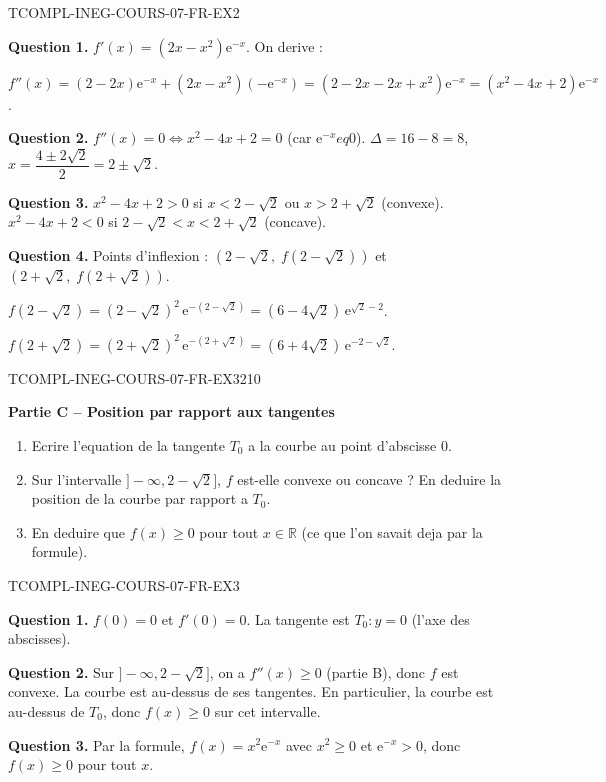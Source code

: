 \begin{corrige}{TCOMPL-INEG-COURS-07-FR-EX2}

\textbf{Question 1.} $f'(x) = (2x - x^2)\mathrm{e}^{-x}$. On derive :

$f''(x) = (2 - 2x)\mathrm{e}^{-x} + (2x - x^2)(-\mathrm{e}^{-x}) = (2 - 2x - 2x + x^2)\mathrm{e}^{-x} = (x^2 - 4x + 2)\mathrm{e}^{-x}$.

\textbf{Question 2.} $f''(x) = 0 \iff x^2 - 4x + 2 = 0$ (car $\mathrm{e}^{-x} 
eq 0$). $\Delta = 16 - 8 = 8$, $x = \dfrac{4 \pm 2\sqrt{2}}{2} = 2 \pm \sqrt{2}$.

\textbf{Question 3.} $x^2 - 4x + 2 > 0$ si $x < 2 - \sqrt{2}$ ou $x > 2 + \sqrt{2}$ (convexe). $x^2 - 4x + 2 < 0$ si $2 - \sqrt{2} < x < 2 + \sqrt{2}$ (concave).

\textbf{Question 4.} Points d'inflexion : $(2 - \sqrt{2},\; f(2-\sqrt{2}))$ et $(2 + \sqrt{2},\; f(2+\sqrt{2}))$.

$f(2-\sqrt{2}) = (2-\sqrt{2})^2\,\mathrm{e}^{-(2-\sqrt{2})} = (6-4\sqrt{2})\,\mathrm{e}^{\sqrt{2}-2}$.

$f(2+\sqrt{2}) = (2+\sqrt{2})^2\,\mathrm{e}^{-(2+\sqrt{2})} = (6+4\sqrt{2})\,\mathrm{e}^{-2-\sqrt{2}}$.

\end{corrige}

\bigskip


\begin{exercice}{TCOMPL-INEG-COURS-07-FR-EX3}{2}{10}

\textbf{Partie C -- Position par rapport aux tangentes}

\begin{enumerate}
  \item Ecrire l'equation de la tangente $T_0$ a la courbe au point d'abscisse $0$.
  \item Sur l'intervalle $]-\infty, 2 - \sqrt{2}]$, $f$ est-elle convexe ou concave ? En deduire la position de la courbe par rapport a $T_0$.
  \item En deduire que $f(x) \geq 0$ pour tout $x \in \mathbb{R}$ (ce que l'on savait deja par la formule).
\end{enumerate}

\end{exercice}

\begin{corrige}{TCOMPL-INEG-COURS-07-FR-EX3}

\textbf{Question 1.} $f(0) = 0$ et $f'(0) = 0$. La tangente est $T_0 : y = 0$ (l'axe des abscisses).

\textbf{Question 2.} Sur $]-\infty, 2 - \sqrt{2}]$, on a $f''(x) \geq 0$ (partie B), donc $f$ est convexe. La courbe est au-dessus de ses tangentes. En particulier, la courbe est au-dessus de $T_0$, donc $f(x) \geq 0$ sur cet intervalle.

\textbf{Question 3.} Par la formule, $f(x) = x^2 \mathrm{e}^{-x}$ avec $x^2 \geq 0$ et $\mathrm{e}^{-x} > 0$, donc $f(x) \geq 0$ pour tout $x$.

\end{corrige}
